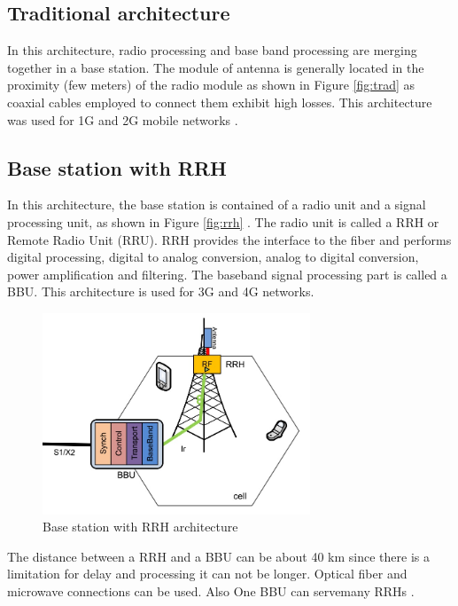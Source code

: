 \documentclass[journal,onecolumn,11pt,draftcls,doublespace]{IEEEtran}
\begin{document}
\subsection{Traditional architecture}
In this architecture, radio processing and base band processing are merging together in a base station.
The module of antenna is generally located in the proximity (few meters) of
the radio module as shown in Figure \eqref{fig:trad} as coaxial cables
employed to connect them exhibit high losses.
This architecture was
used for 1G and 2G mobile networks \cite{369}.


\subsection{Base station with RRH}
In this architecture, the base station is contained of a radio unit and a
signal processing unit, as shown in Figure \eqref{fig:rrh} . The radio unit
is called a RRH or Remote Radio Unit (RRU). RRH provides
the interface to the fiber and performs digital processing,
digital to analog conversion, analog to digital conversion,
power amplification and filtering. The baseband signal
processing part is called a BBU. This architecture is used for 3G  and 4G networks.
\begin{figure}
  \centering
    \includegraphics[width=0.5\linewidth, height=6cm]{rrh}
  \caption{Base station with RRH architecture \cite{369}}
  \label{fig:rrh}
\end{figure}
The distance between a RRH and a BBU  can be about 40 km since there is a limitation for delay and processing it can not be longer.
Optical fiber and microwave connections
can be used.
Also One BBU can servemany RRHs \cite{369}.
\end{document}

